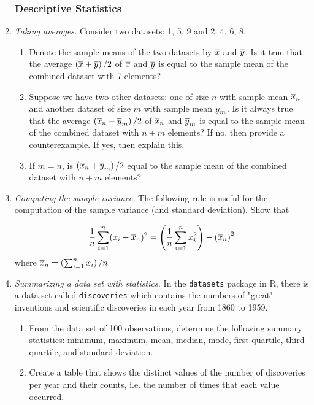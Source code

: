 \begin{enumerate}
\subsubsection*{Descriptive Statistics}

\item \emph{Taking averages.} Consider two datasets: 1, 5, 9 and 2,
    4, 6, 8.
\begin{enumerate}
\item Denote the sample means of the two datasets by $\overline{x}$ and
      $\overline{y}$. Is it true that the average
      $\left(\overline{x}+\overline{y}\right)/2$ of $\overline{x}$ and $\overline{y}$ is
      equal to the sample mean of the combined dataset with 7
      elements?
\item Suppose we have two other datasets: one of size $n$ with sample
  mean $\overline{x}_n$ and another dataset of size $m$ with sample mean
  $\overline{y}_m$. Is it always true that the average
  $\left(\overline{x}_n + \overline{y}_m\right)/2$ of $\overline{x}_n$ and
  $\overline{y}_m$ is equal to the sample mean of the combined dataset with
  $n + m$ elements? If no, then provide a counterexample. If yes, then
  explain this.
\item If $m=n$, is $\left(\overline{x}_n + \overline{y}_m\right)/2$ equal to the
  sample mean of the combined dataset with $n + m$ elements?
\end{enumerate}

\item \emph{Computing the sample variance.} The following rule is
  useful for the computation of the sample variance (and standard
  deviation). Show that

  \[ \frac{1}{n}\sum_{i=1}^n(x_i - \overline{x}_n)^2 = \left(\frac{1}{n}\sum_{i=1}^nx_i^2 \right)- \left(\overline{x}_n\right)^2 \]
    where $\overline{x}_n = \left(\sum_{i=1}^n x_i\right)/n$

\item \emph{Summarizing a data set with statistics.}  In the
  \texttt{datasets} package in R, there is a data set called
  \texttt{discoveries} which contains the numbers of "great"
  inventions and scientific discoveries in each year from 1860 to
  1959.

\begin{enumerate}
\item From the data set of 100 observations, determine the following
  summary statistics: minimum, maximum, mean, median, mode, first
  quartile, third quartile, and standard deviation.
\item Create a table that shows the distinct values of the number of
  discoveries per year and their counts, i.e. the number of times that
  each value occurred.
\end{enumerate}


\end{enumerate}
